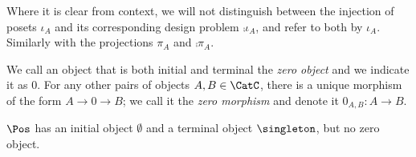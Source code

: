 \begin{remark}Where it is clear from context, we will not distinguish between the injection of posets $\iota_A$ and its corresponding design problem $\comp{\iota_A}$, and refer to both by $\iota_A$. Similarly with the projections $\pi_A$ and $\comp{\pi_A}$.
\end{remark}

\begin{table}[b]
\caption{A comparison of $\Pos, \Set$, and $\DP$.}
\end{table}

\begin{shaded}
\begin{definition}
We call an object that is both initial and terminal the \emph{zero object} and we indicate it as $0$. For any other pairs of objects  $A, B\in\CatC$, there is a unique morphism of the form $A \to 0\to B$; we call it the \emph{zero morphism} and denote it $0_{A,B}\colon A \to B$.
\end{definition}
\end{shaded}

\begin{example}
$\Pos$ has an initial object $\emptyset$ and a terminal object $\singleton$, but no zero object.\end{example}


